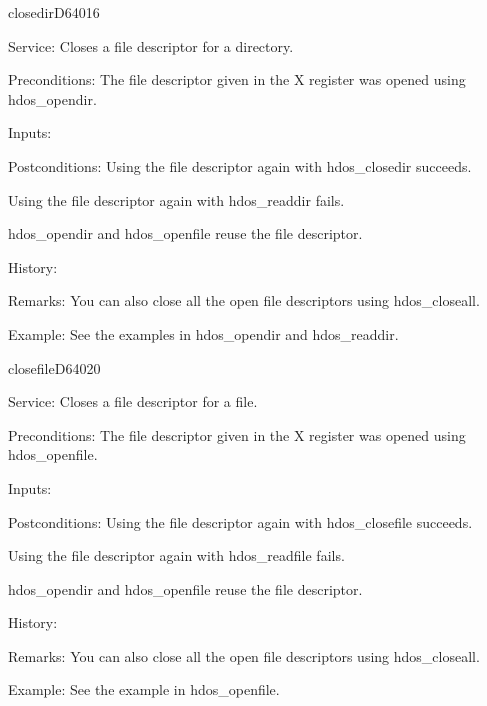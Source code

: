 \newpage
\begin{hyppotrap}{closedir}{D640}{16}
\item [Service:]
  Closes a file descriptor for a directory.
\item [Preconditions:]
  The file descriptor given in the X register was opened using hdos\_opendir.
\item [Inputs:]
\item [Postconditions:]
  Using the file descriptor again with hdos\_closedir succeeds.

  Using the file descriptor again with hdos\_readdir fails.

  hdos\_opendir and hdos\_openfile reuse the file descriptor.
\item [History:]
\item [Remarks:]
  You can also close all the open file descriptors using hdos\_closeall.
\item [Example:]
  See the examples in hdos\_opendir and hdos\_readdir.
\end{hyppotrap}


\newpage
\begin{hyppotrap}{closefile}{D640}{20}
\item [Service:]
  Closes a file descriptor for a file.
\item [Preconditions:]
  The file descriptor given in the X register was opened using hdos\_openfile.
\item [Inputs:]
\item [Postconditions:]
  Using the file descriptor again with hdos\_closefile succeeds.

  Using the file descriptor again with hdos\_readfile fails.

  hdos\_opendir and hdos\_openfile reuse the file descriptor.
\item [History:]
\item [Remarks:]
  You can also close all the open file descriptors using hdos\_closeall.
\item [Example:]
  See the example in hdos\_openfile.
\end{hyppotrap}


